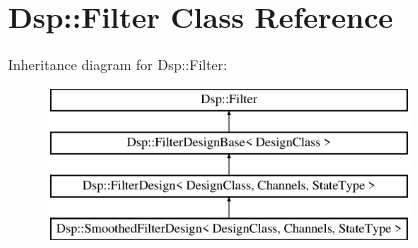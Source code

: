 \hypertarget{classDsp_1_1Filter}{\section{Dsp\-:\-:Filter Class Reference}
\label{classDsp_1_1Filter}
}
Inheritance diagram for Dsp\-:\-:Filter\-:\begin{figure}[H]
\begin{center}
\leavevmode
\includegraphics[height=4.000000cm]{classDsp_1_1Filter}
\end{center}
\end{figure}
